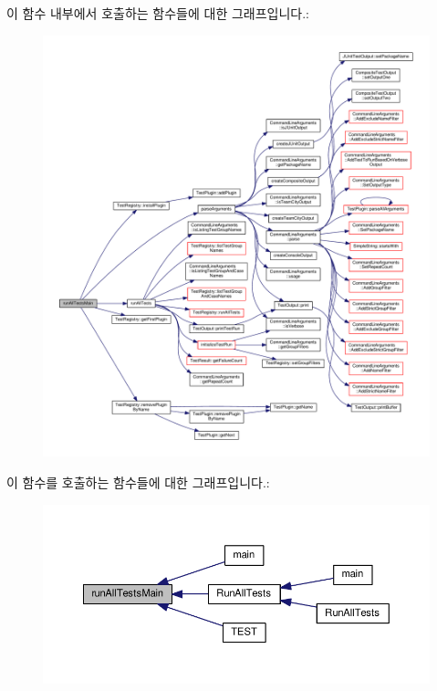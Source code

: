 이 함수 내부에서 호출하는 함수들에 대한 그래프입니다.\+:
\nopagebreak
\begin{figure}[H]
\begin{center}
\leavevmode
\includegraphics[width=350pt]{class_command_line_test_runner_ae2d295539b64a4d4ea8649fb193c917e_cgraph}
\end{center}
\end{figure}




이 함수를 호출하는 함수들에 대한 그래프입니다.\+:
\nopagebreak
\begin{figure}[H]
\begin{center}
\leavevmode
\includegraphics[width=350pt]{class_command_line_test_runner_ae2d295539b64a4d4ea8649fb193c917e_icgraph}
\end{center}
\end{figure}




